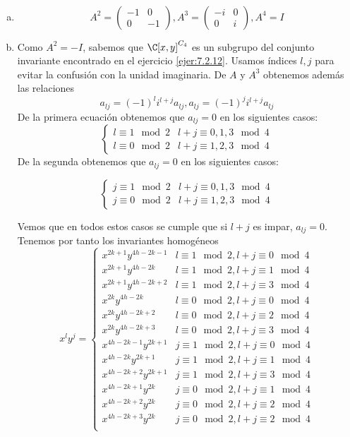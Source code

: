 \documentclass[twoside]{article}
\begin{document}
\begin{solucion}\
\begin{enumerate}[a.]
\item
\[
A^2=\begin{pmatrix}
-1 & 0\\
0 & -1
\end{pmatrix}, A^3=\begin{pmatrix}
-i & 0\\
0 & i
\end{pmatrix}, A^4=I
\]
\item Como $A^2=-I$, sabemos que $\C[x, y]^{C_4}$ es un subgrupo del conjunto invariante encontrado en el ejercicio \ref{ejer:7.2.12}. Usamos índices $l,j$ para evitar la confusión con la unidad imaginaria. De $A$ y $A^3$ obtenemos además las relaciones
\[
a_{lj}=(-1)^li^{l+j}a_{lj}, a_{lj}=(-1)^ji^{l+j}a_{lj}
\]
De la primera ecuación obtenemos que $a_{lj}=0$ en los siguientes casos:
\[
\begin{cases}
l\equiv 1\mod 2 & l+j\equiv 0,1,3\mod 4\\
l\equiv 0\mod 2 & l+j\equiv 1,2,3\mod 4
\end{cases}
\]
De la segunda obtenemos que $a_{lj}= 0$ en los siguientes casos:

\[
\begin{cases}
j\equiv 1\mod 2 & l+j\equiv 0,1,3\mod 4\\
j\equiv 0\mod 2 & l+j\equiv 1,2,3\mod 4
\end{cases}
\]

Vemos que en todos estos casos se cumple que si $l+j$ es impar, $a_{lj}=0$.  Tenemos por tanto los invariantes homogéneos
\[
x^ly^j=\begin{cases}
x^{2k+1}y^{4h-2k-1} & l\equiv 1\mod 2,l+j\equiv 0\mod 4\\
x^{2k+1}y^{4h-2k} & l\equiv 1\mod 2,l+j\equiv 1\mod 4\\
x^{2k+1}y^{4h-2k+2} & l\equiv 1\mod 2,l+j\equiv 3\mod 4\\
x^{2k}y^{4h-2k} & l\equiv 0\mod 2,l+j\equiv 0\mod 4\\
x^{2k}y^{4h-2k+2} & l\equiv 0\mod 2,l+j\equiv 2\mod 4\\
x^{2k}y^{4h-2k+3} & l\equiv 0\mod 2,l+j\equiv 3\mod 4\\
x^{4h-2k-1}y^{2k+1} & j\equiv 1\mod 2,l+j\equiv 0\mod 4\\
x^{4h-2k}y^{2k+1} & j\equiv 1\mod 2,l+j\equiv 1\mod 4\\
x^{4h-2k+2}y^{2k+1} & j\equiv 1\mod 2,l+j\equiv 3\mod 4\\
x^{4h-2k+1}y^{2k} & j\equiv 0\mod 2,l+j\equiv 1\mod 4\\
x^{4h-2k+2}y^{2k} & j\equiv 0\mod 2,l+j\equiv 2\mod 4\\
x^{4h-2k+3}y^{2k} & j\equiv 0\mod 2,l+j\equiv 2\mod 4\\
\end{cases}
\]


\end{enumerate}
\end{solucion}
\end{document}
